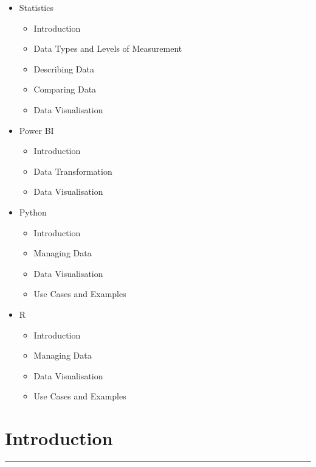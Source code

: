 \documentclass[
]{book}
\providecommand{\tightlist}{%
  \setlength{\itemsep}{0pt}\setlength{\parskip}{0pt}}
\begin{document}
\begin{itemize}
\tightlist
\item
  Statistics

  \begin{itemize}
  \tightlist
  \item
    Introduction
  \item
    Data Types and Levels of Measurement
  \item
    Describing Data
  \item
    Comparing Data
  \item
    Data Visualisation
  \end{itemize}
\item
  Power BI

  \begin{itemize}
  \tightlist
  \item
    Introduction
  \item
    Data Transformation
  \item
    Data Visualisation
  \end{itemize}
\item
  Python

  \begin{itemize}
  \tightlist
  \item
    Introduction
  \item
    Managing Data
  \item
    Data Visualisation
  \item
    Use Cases and Examples
  \end{itemize}
\item
  R

  \begin{itemize}
  \tightlist
  \item
    Introduction
  \item
    Managing Data
  \item
    Data Visualisation
  \item
    Use Cases and Examples
  \end{itemize}
\end{itemize}

\hypertarget{intro}{%
\chapter{Introduction}\label{intro}}

\begin{center}\rule{0.5\linewidth}{0.5pt}\end{center}
\end{document}
